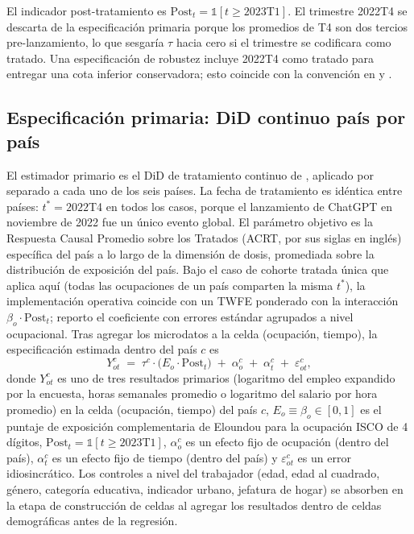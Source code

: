 El indicador post-tratamiento es $\text{Post}_t = \mathbb{1}[t \geq 2023\text{T1}]$. El trimestre 2022T4 se descarta de la especificación primaria porque los promedios de T4 son dos tercios pre-lanzamiento, lo que sesgaría $\tau$ hacia cero si el trimestre se codificara como tratado. Una especificación de robustez incluye 2022T4 como tratado para entregar una cota inferior conservadora; esto coincide con la convención en \citet{HumlumVestergaard2025_llm} y \citet{Hartley2024_labor_effects}.

\subsection{Especificación primaria: DiD continuo país por país}
\label{subsec:method_primary}

El estimador primario es el DiD de tratamiento continuo de \citet{CallawayCGBS2024_continuous}, aplicado por separado a cada uno de los seis países. La fecha de tratamiento es idéntica entre países: $t^* = 2022$T4 en todos los casos, porque el lanzamiento de ChatGPT en noviembre de 2022 fue un único evento global. El parámetro objetivo es la Respuesta Causal Promedio sobre los Tratados (ACRT, por sus siglas en inglés) específica del país a lo largo de la dimensión de dosis, promediada sobre la distribución de exposición del país. Bajo el caso de cohorte tratada única que aplica aquí (todas las ocupaciones de un país comparten la misma $t^\ast$), la implementación operativa coincide con un TWFE ponderado con la interacción $\beta_o \cdot \text{Post}_t$; reporto el coeficiente con errores estándar agrupados a nivel ocupacional. Tras agregar los microdatos a la celda (ocupación, tiempo), la especificación estimada dentro del país $c$ es
\begin{equation}
Y_{ot}^{c} \;=\; \tau^{c} \cdot \bigl(E_{o} \cdot \text{Post}_t\bigr) \;+\; \alpha_{o}^{c} \;+\; \alpha_{t}^{c} \;+\; \varepsilon_{ot}^{c},
\label{eq:did_main}
\end{equation}
donde $Y_{ot}^c$ es uno de tres resultados primarios (logaritmo del empleo expandido por la encuesta, horas semanales promedio o logaritmo del salario por hora promedio) en la celda (ocupación, tiempo) del país $c$, $E_{o} \equiv \beta_o \in [0,1]$ es el puntaje de exposición complementaria de Eloundou para la ocupación ISCO de 4 dígitos, $\text{Post}_t = \mathbb{1}[t \geq 2023\text{T1}]$, $\alpha_{o}^c$ es un efecto fijo de ocupación (dentro del país), $\alpha_{t}^c$ es un efecto fijo de tiempo (dentro del país) y $\varepsilon_{ot}^c$ es un error idiosincrático. Los controles a nivel del trabajador (edad, edad al cuadrado, género, categoría educativa, indicador urbano, jefatura de hogar) se absorben en la etapa de construcción de celdas al agregar los resultados dentro de celdas demográficas antes de la regresión.

